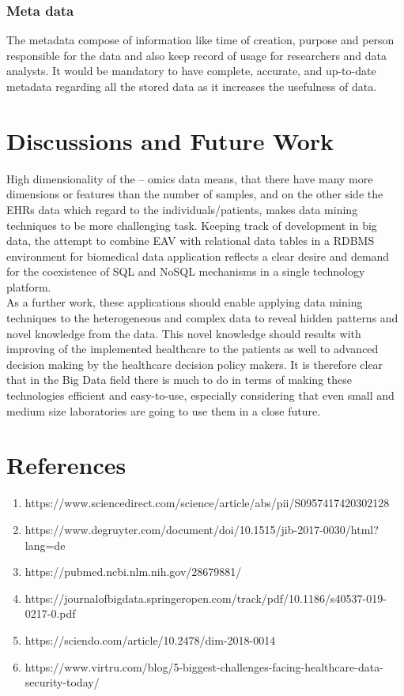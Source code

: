 \documentclass[10pt,a4paper,twoside]{article}
\begin{document}
\subsubsection*{Meta data}
The metadata compose of information like time of creation, purpose and person responsible for the data and also keep record of usage for researchers and data analysts. It would be mandatory to have complete, accurate, and up-to-date metadata regarding all the stored data as it increases the usefulness of data.

\section*{Discussions and Future Work}
High dimensionality of the – omics data means, that there have many more dimensions or features than the number of samples, and on the other side the EHRs data which regard to the individuals/patients, makes data mining techniques to be more challenging task. Keeping track of development in big data, the attempt to combine EAV with relational data tables in a RDBMS environment for biomedical data application reflects a clear desire and demand for the coexistence of SQL and NoSQL mechanisms in a single technology platform.\\

As a further work, these applications should enable applying data mining techniques to the heterogeneous and complex data to reveal hidden patterns and novel knowledge from the data. This novel knowledge should results with improving of the implemented healthcare to the patients as well to advanced decision making by the healthcare decision policy makers. It is therefore clear that in the Big Data field there is much to do in terms of making these technologies efficient and easy-to-use, especially considering that even small and medium size laboratories are going to use them in a close future.

\section*{References}

\begin{enumerate}
    \item https://www.sciencedirect.com/science/article/abs/pii/S0957417420302128
    \item https://www.degruyter.com/document/doi/10.1515/jib-2017-0030/html?lang=de
    \item https://pubmed.ncbi.nlm.nih.gov/28679881/
    \item https://journalofbigdata.springeropen.com/track/pdf/10.1186/s40537-019-0217-0.pdf
    \item https://sciendo.com/article/10.2478/dim-2018-0014
    \item https://www.virtru.com/blog/5-biggest-challenges-facing-healthcare-data-security-today/
\end{enumerate}
\end{document}
